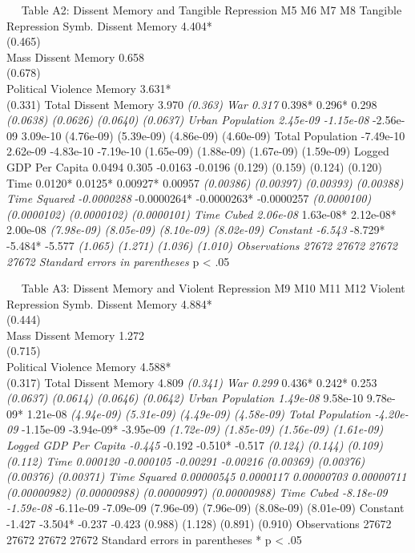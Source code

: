 \documentclass[ignorenonframetext,]{beamer}
\begin{document}
\begin{frame}[fragile]
  Table A2: Dissent Memory and Tangible Repression M5 M6 M7 M8 Tangible
Repression Symb. Dissent Memory 4.404*\\
(0.465)\\
Mass Dissent Memory 0.658\\
(0.678)\\
Political Violence Memory 3.631*\\
(0.331) Total Dissent Memory 3.970\emph{ (0.363) War 0.317} 0.398*
0.296* 0.298\emph{ (0.0638) (0.0626) (0.0640) (0.0637) Urban Population
2.45e-09 -1.15e-08} -2.56e-09 3.09e-10 (4.76e-09) (5.39e-09) (4.86e-09)
(4.60e-09) Total Population -7.49e-10 2.62e-09 -4.83e-10 -7.19e-10
(1.65e-09) (1.88e-09) (1.67e-09) (1.59e-09) Logged GDP Per Capita 0.0494
0.305 -0.0163 -0.0196 (0.129) (0.159) (0.124) (0.120) Time 0.0120*
0.0125* 0.00927* 0.00957\emph{ (0.00386) (0.00397) (0.00393) (0.00388)
Time Squared -0.0000288} -0.0000264* -0.0000263* -0.0000257\emph{
(0.0000100) (0.0000102) (0.0000102) (0.0000101) Time Cubed 2.06e-08}
1.63e-08* 2.12e-08* 2.00e-08\emph{ (7.98e-09) (8.05e-09) (8.10e-09)
(8.02e-09) Constant -6.543} -8.729* -5.484* -5.577\emph{ (1.065) (1.271)
(1.036) (1.010) Observations 27672 27672 27672 27672 Standard errors in
parentheses } p \textless{} .05

  Table A3: Dissent Memory and Violent Repression M9 M10 M11 M12 Violent
Repression Symb. Dissent Memory 4.884*\\
(0.444)\\
Mass Dissent Memory 1.272\\
(0.715)\\
Political Violence Memory 4.588*\\
(0.317) Total Dissent Memory 4.809\emph{ (0.341) War 0.299} 0.436*
0.242* 0.253\emph{ (0.0637) (0.0614) (0.0646) (0.0642) Urban Population
1.49e-08} 9.58e-10 9.78e-09* 1.21e-08\emph{ (4.94e-09) (5.31e-09)
(4.49e-09) (4.58e-09) Total Population -4.20e-09} -1.15e-09 -3.94e-09*
-3.95e-09\emph{ (1.72e-09) (1.85e-09) (1.56e-09) (1.61e-09) Logged GDP
Per Capita -0.445} -0.192 -0.510* -0.517\emph{ (0.124) (0.144) (0.109)
(0.112) Time 0.000120 -0.000105 -0.00291 -0.00216 (0.00369) (0.00376)
(0.00376) (0.00371) Time Squared 0.00000545 0.0000117 0.00000703
0.00000711 (0.00000982) (0.00000988) (0.00000997) (0.00000988) Time
Cubed -8.18e-09 -1.59e-08} -6.11e-09 -7.09e-09 (7.96e-09) (7.96e-09)
(8.08e-09) (8.01e-09) Constant -1.427 -3.504* -0.237 -0.423 (0.988)
(1.128) (0.891) (0.910) Observations 27672 27672 27672 27672 Standard
errors in parentheses * p \textless{} .05


\end{frame}
\end{document}
